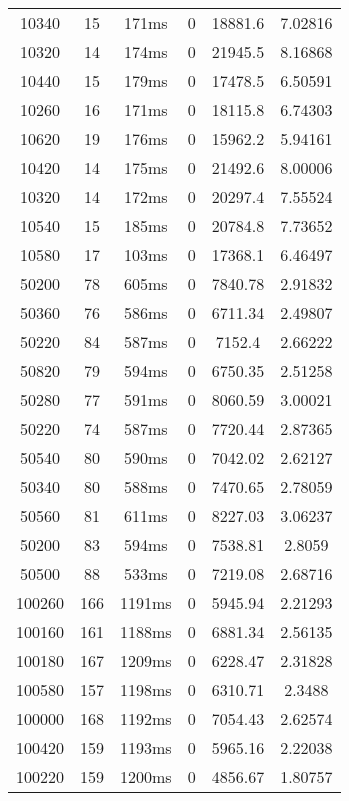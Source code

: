 \documentclass[./main.tex]{subfiles}
\begin{document}
\begin{table}
\begin{tabular}{ c | c | c | c | c | c }
        10340 & 15 & 171ms & 0 & 18881.6 & 7.02816 \\
        10320 & 14 & 174ms & 0 & 21945.5 & 8.16868 \\
        10440 & 15 & 179ms & 0 & 17478.5 & 6.50591 \\
        10260 & 16 & 171ms & 0 & 18115.8 & 6.74303 \\
        10620 & 19 & 176ms & 0 & 15962.2 & 5.94161 \\
        10420 & 14 & 175ms & 0 & 21492.6 & 8.00006 \\
        10320 & 14 & 172ms & 0 & 20297.4 & 7.55524 \\
        10540 & 15 & 185ms & 0 & 20784.8 & 7.73652 \\
        10580 & 17 & 103ms & 0 & 17368.1 & 6.46497 \\
        \hline
        50200 & 78 & 605ms & 0 & 7840.78 & 2.91832 \\
        50360 & 76 & 586ms & 0 & 6711.34 & 2.49807 \\
        50220 & 84 & 587ms & 0 & 7152.4 & 2.66222 \\
        50820 & 79 & 594ms & 0 & 6750.35 & 2.51258 \\
        50280 & 77 & 591ms & 0 & 8060.59 & 3.00021 \\
        50220 & 74 & 587ms & 0 & 7720.44 & 2.87365 \\
        50540 & 80 & 590ms & 0 & 7042.02 & 2.62127 \\
        \rowcolor{lightgray} 50340 & 80 & 588ms & 0 & 7470.65 & 2.78059 \\
        50560 & 81 & 611ms & 0 & 8227.03 & 3.06237 \\
        50200 & 83 & 594ms & 0 & 7538.81 & 2.8059 \\
        50500 & 88 & 533ms & 0 & 7219.08 & 2.68716 \\
        \hline
        100260 & 166 & 1191ms & 0 & 5945.94 & 2.21293 \\
        100160 & 161 & 1188ms & 0 & 6881.34 & 2.56135 \\
        \rowcolor{lightgray} 100180 & 167 & 1209ms & 0 & 6228.47 & 2.31828 \\
        100580 & 157 & 1198ms & 0 & 6310.71 & 2.3488 \\
        100000 & 168 & 1192ms & 0 & 7054.43 & 2.62574 \\
        100420 & 159 & 1193ms & 0 & 5965.16 & 2.22038 \\
        100220 & 159 & 1200ms & 0 & 4856.67 & 1.80757 \\

\end{tabular}
\end{table}
\end{document}
